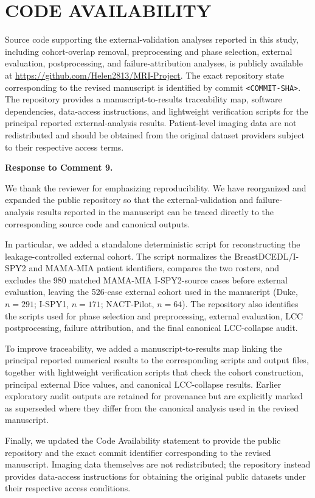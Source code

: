 \section*{CODE AVAILABILITY}

Source code supporting the external-validation analyses reported in this
study, including cohort-overlap removal, preprocessing and phase selection,
external evaluation, postprocessing, and failure-attribution analyses, is
publicly available at
\url{https://github.com/Helen2813/MRI-Project}. The exact repository state
corresponding to the revised manuscript is identified by commit
\texttt{<COMMIT-SHA>}. The repository provides a manuscript-to-results
traceability map, software dependencies, data-access instructions, and
lightweight verification scripts for the principal reported external-analysis
results. Patient-level imaging data are not redistributed and should be
obtained from the original dataset providers subject to their respective
access terms.


\noindent\textbf{Response to Comment 9.}

We thank the reviewer for emphasizing reproducibility. We have reorganized
and expanded the public repository so that the external-validation and
failure-analysis results reported in the manuscript can be traced directly
to the corresponding source code and canonical outputs.

In particular, we added a standalone deterministic script for reconstructing
the leakage-controlled external cohort. The script normalizes the
BreastDCEDL/I-SPY2 and MAMA-MIA patient identifiers, compares the two
rosters, and excludes the 980 matched MAMA-MIA I-SPY2-source cases before
external evaluation, leaving the 526-case external cohort used in the
manuscript (Duke, $n=291$; I-SPY1, $n=171$; NACT-Pilot, $n=64$). The
repository also identifies the scripts used for phase selection and
preprocessing, external evaluation, LCC postprocessing, failure attribution,
and the final canonical LCC-collapse audit.

To improve traceability, we added a manuscript-to-results map linking the
principal reported numerical results to the corresponding scripts and output
files, together with lightweight verification scripts that check the cohort
construction, principal external Dice values, and canonical LCC-collapse
results. Earlier exploratory audit outputs are retained for provenance but
are explicitly marked as superseded where they differ from the canonical
analysis used in the revised manuscript.

Finally, we updated the Code Availability statement to provide the public
repository and the exact commit identifier corresponding to the revised
manuscript. Imaging data themselves are not redistributed; the repository
instead provides data-access instructions for obtaining the original public
datasets under their respective access conditions.
